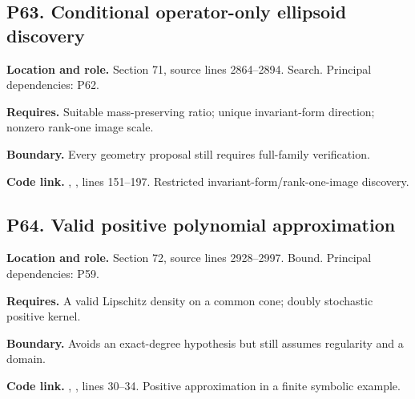 \documentclass[11pt,letterpaper]{article}
\begin{document}
\par\noindent\begin{minipage}{\textwidth}
\subsection{P63. Conditional operator-only ellipsoid
discovery}\label{p63.-conditional-operator-only-ellipsoid-discovery}

\textbf{Location and role.} Section 71, source lines 2864--2894. Search.
Principal dependencies: P62.

\textbf{Requires.} Suitable mass-preserving ratio; unique invariant-form
direction; nonzero rank-one image scale.

\textbf{Boundary.} Every geometry proposal still requires full-family
verification.

\textbf{Code link.} ,
, lines 151--197. Restricted
invariant-form/rank-one-image discovery.
\end{minipage}\par\medskip

\par\noindent\begin{minipage}{\textwidth}
\subsection{P64. Valid positive polynomial
approximation}\label{p64.-valid-positive-polynomial-approximation}

\textbf{Location and role.} Section 72, source lines 2928--2997. Bound.
Principal dependencies: P59.

\textbf{Requires.} A valid Lipschitz density on a common cone; doubly
stochastic positive kernel.

\textbf{Boundary.} Avoids an exact-degree hypothesis but still assumes
regularity and a domain.

\textbf{Code link.} ,
, lines 30--34. Positive approximation in
a finite symbolic example.
\end{minipage}\par\medskip
\end{document}
